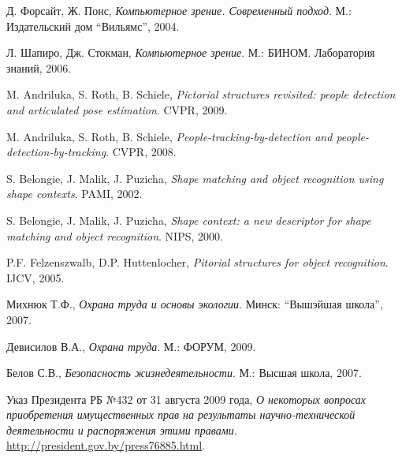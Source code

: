 \begin{thebibliography}{99}

  Д. Форсайт, Ж. Понс,
  \emph{Компьютерное зрение. Современный подход}.
  М.: Издательский дом ``Вильямс'',
  2004.

  Л. Шапиро, Дж. Стокман,
  \emph{Компьютерное зрение}.
  М.: БИНОМ. Лаборатория знаний,
  2006.

  M. Andriluka, S. Roth, B. Schiele,
  \emph{Pictorial structures revisited: people detection and articulated pose estimation}.
  CVPR,
  2009.

  M. Andriluka, S. Roth, B. Schiele,
  \emph{People-tracking-by-detection and people-detection-by-tracking}.
  CVPR,
  2008.

  S. Belongie, J. Malik, J. Puzicha,
  \emph{Shape matching and object recognition using shape contexts}.
  PAMI,
  2002.

  S. Belongie, J. Malik, J. Puzicha,
  \emph{Shape context: a new descriptor for shape matching and object recognition}.
  NIPS,
  2000.

  P.F. Felzenszwalb, D.P. Huttenlocher,
  \emph{Pitorial structures for object recognition}.
  IJCV,
  2005.

  Михнюк Т.Ф.,
  \emph{Охрана труда и основы экологии}.
  Минск: ``Вышэйшая школа'',
  2007.

  Девисилов В.А.,
  \emph{Охрана труда}.
  М.: ФОРУМ,
  2009.

  Белов С.В.,
  \emph{Безопасность жизнедеятельности}.
  М.: Высшая школа,
  2007.

  Указ Президента РБ №432 от 31 августа 2009 года,
  \emph{О некоторых вопросах приобретения имущественных прав на результаты научно-технической деятельности и распоряжения этими правами}.
  \href{http://president.gov.by/press76885.html}{http://president.gov.by/press76885.html}.

\end{thebibliography}
